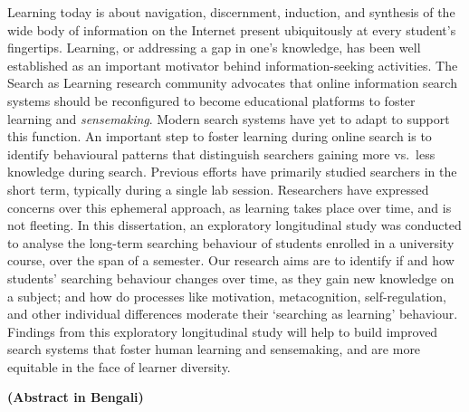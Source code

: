 \documentclass[letterpaper, nobind]{templates/ociamthesis}
\begin{document}
\begin{romanpages}
\begin{spacing}{1.5}
  \indent
  Learning today is about navigation, discernment, induction, and synthesis of the wide body of information on the Internet present ubiquitously at every student's fingertips.
  Learning, or addressing a gap in one's knowledge, has been well established as an important motivator behind information-seeking activities.
  The Search as Learning research community advocates that online information search systems should be reconfigured to become educational platforms to foster learning and \emph{sensemaking}.
  Modern search systems have yet to adapt to support this function.
  An important step to foster learning during online search is to identify behavioural patterns that distinguish searchers gaining more vs.~less knowledge during search.
  Previous efforts have primarily studied searchers in the short term, typically during a single lab session.
  Researchers have expressed concerns over this ephemeral approach, as learning takes place over time, and is not fleeting.
  In this dissertation, an exploratory longitudinal study was conducted to analyse the long-term searching behaviour of students enrolled in a university course, over the span of a semester.
  Our research aims are to identify if and how students' searching behaviour changes over time, as they gain new knowledge on a subject; and how do processes like motivation, metacognition, self-regulation, and other individual differences moderate their `searching as learning' behaviour.
  Findings from this exploratory longitudinal study will help to build improved search systems that foster human learning and sensemaking, and are more equitable in the face of learner diversity.
\end{spacing}


\newpage
\begin{center}
  \textbf{ (Abstract in Bengali)}\\
  
  \vspace{18pt}
  
  \begin{spacing}{2}
  \end{spacing}

  \vspace{18pt}


\end{center}
\end{romanpages}
\end{document}
